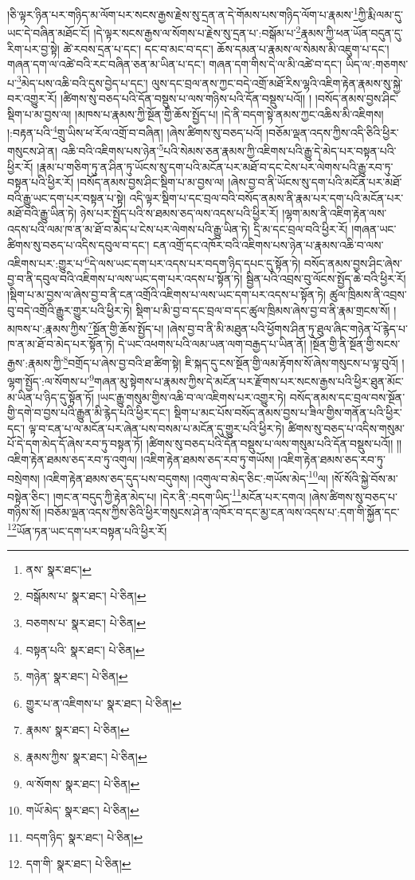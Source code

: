 །ཅི་ལྟར་ཉིན་པར་གཉིད་མ་ལོག་པར་སངས་རྒྱས་རྗེས་སུ་དྲན་ན་དེ་གོམས་པས་གཉིད་ལོག་པ་རྣམས་\footnote{ནས་  སྣར་ཐང་། }ཀྱི་རྨི་ལམ་དུ་ཡང་དེ་བཞིན་མཐོང་ངོ། །དེ་ལྟར་སངས་རྒྱས་ལ་སོགས་པ་རྗེས་སུ་དྲན་པ་:བསྒོམ་པ་\footnote{བསྒོམས་པ་  སྣར་ཐང་།  པེ་ཅིན། }རྣམས་ཀྱི་ཕན་ཡོན་བདུན་དུ་རིག་པར་བྱ་སྟེ། ཚེ་རབས་དྲན་པ་དང་། དང་བ་མང་བ་དང་། ཆོས་དམན་པ་རྣམས་ལ་སེམས་མི་འཇུག་པ་དང་། གཞན་དག་ལ་འཚེ་བའི་རང་བཞིན་ཅན་མ་ཡིན་པ་དང་། གཞན་དག་གིས་དེ་ལ་མི་འཚེ་བ་དང་། ཡིད་ལ་:གཅགས་པ་\footnote{བཅགས་པ་  སྣར་ཐང་།  པེ་ཅིན། }མེད་པས་འཆི་བའི་དུས་བྱེད་པ་དང་། ལུས་དང་བྲལ་ནས་ཀྱང་བདེ་འགྲོ་མཐོ་རིས་ལྷའི་འཇིག་རྟེན་རྣམས་སུ་སྐྱེ་བར་འགྱུར་རོ། །ཚིགས་སུ་བཅད་པའི་དོན་བསྡུས་པ་ལས་གཉིས་པའི་དོན་བསྡུས་པའོ།། །
།བསོད་ནམས་བྱས་ཤིང་སྡིག་པ་མ་བྱས་ལ། །མཁས་པ་རྣམས་ཀྱི་སྔོན་གྱི་ཆོས་སྤྱོད་པ། །དེ་ནི་བདག་སྟེ་ནམས་ཀྱང་འཆིས་མི་འཇིགས། །:བརྟན་པའི་\footnote{བསྟན་པའི་  སྣར་ཐང་།  པེ་ཅིན། }གྲུ་ཡིས་ཕ་རོལ་འགྲོ་བ་བཞིན། །ཞེས་ཚིགས་སུ་བཅད་པའོ། །བཅོམ་ལྡན་འདས་ཀྱིས་འདི་ཅིའི་ཕྱིར་གསུངས་ཤེ་ན། འཆི་བའི་འཇིགས་པས་ཉེན་\footnote{གཉེན་  སྣར་ཐང་།  པེ་ཅིན། }པའི་སེམས་ཅན་རྣམས་ཀྱི་འཇིགས་པའི་རྒྱུ་དེ་མེད་པར་བསྟན་པའི་ཕྱིར་རོ། །རྣམ་པ་གཅིག་ཏུ་ན་ཤིན་ཏུ་ཡོངས་སུ་དག་པའི་མངོན་པར་མཐོ་བ་དང་ངེས་པར་ལེགས་པའི་རྒྱུ་རབ་ཏུ་བསྟན་པའི་ཕྱིར་རོ། །བསོད་ནམས་བྱས་ཤིང་སྡིག་པ་མ་བྱས་ལ། །ཞེས་བྱ་བ་ནི་ཡོངས་སུ་དག་པའི་མངོན་པར་མཐོ་བའི་རྒྱུ་ཡང་དག་པར་བསྟན་པ་སྟེ། འདི་ལྟར་སྡིག་པ་དང་བྲལ་བའི་བསོད་ནམས་ནི་རྣམ་པར་དག་པའི་མངོན་པར་མཐོ་བའི་རྒྱུ་ཡིན་ཏེ། ཉེས་པར་སྤྱོད་པའི་ས་ཐམས་ཅད་ལས་འདས་པའི་ཕྱིར་རོ། །ལྷག་མས་ནི་འཇིག་རྟེན་ལས་འདས་པའི་ལམ་ཁ་ན་མ་ཐོ་བ་མེད་པ་ངེས་པར་ལེགས་པའི་རྒྱུ་ཡིན་ཏེ། དྲི་མ་དང་བྲལ་བའི་ཕྱིར་རོ། །གཞན་ཡང་ཚིགས་སུ་བཅད་པ་འདིས་དབུལ་བ་དང་། ངན་འགྲོ་དང་འཁོར་བའི་འཇིགས་པས་ཉེན་པ་རྣམས་འཆི་བ་ལས་འཇིགས་པར་:གྱུར་པ་\footnote{གྱུར་པ་ན་འཇིགས་པ་  སྣར་ཐང་།  པེ་ཅིན། }དེ་ལས་ཡང་དག་པར་འདས་པར་བདག་ཉིད་དཔང་དུ་སྟོན་ཏེ། བསོད་ནམས་བྱས་ཤིང་ཞེས་བྱ་བ་ནི་དབུལ་བའི་འཇིགས་པ་ལས་ཡང་དག་པར་འདས་པ་སྟོན་ཏེ། སྦྱིན་པའི་འབྲས་བུ་ལོངས་སྤྱོད་ཆེ་བའི་ཕྱིར་རོ། །སྡིག་པ་མ་བྱས་ལ་ཞེས་བྱ་བ་ནི་ངན་འགྲོའི་འཇིགས་པ་ལས་ཡང་དག་པར་འདས་པ་སྟོན་ཏེ། ཚུལ་ཁྲིམས་ནི་འབྲས་བུ་བདེ་འགྲོའི་རྒྱུར་གྱུར་པའི་ཕྱིར་ཏེ། སྡིག་པ་མི་བྱ་བ་དང་བྲལ་བ་དང་ཚུལ་ཁྲིམས་ཞེས་བྱ་བ་ནི་རྣམ་གྲངས་སོ། །མཁས་པ་:རྣམས་ཀྱིས་\footnote{རྣམས་  སྣར་ཐང་།  པེ་ཅིན། }སྔོན་གྱི་ཆོས་སྤྱོད་པ། །ཞེས་བྱ་བ་ནི་མི་མཐུན་པའི་ཕྱོགས་ཤིན་ཏུ་ཐུལ་ཞིང་གཉེན་པོ་རྙེད་པ་ཁ་ན་མ་ཐོ་བ་མེད་པར་སྟོན་ཏེ། དེ་ཡང་འཕགས་པའི་ལམ་ཡན་ལག་བརྒྱད་པ་ཡིན་ནོ། །སྔོན་གྱི་ནི་སྔོན་གྱི་སངས་རྒྱས་:རྣམས་ཀྱི་\footnote{རྣམས་ཀྱིས་  སྣར་ཐང་།  པེ་ཅིན། }བགྲོད་པ་ཞེས་བྱ་བའི་ཐ་ཚིག་སྟེ། ཇི་སྐད་དུ་ངས་སྔོན་གྱི་ལམ་རྟོགས་སོ་ཞེས་གསུངས་པ་ལྟ་བུའོ། །ལྷག་སྤྱོད་:ལ་སོགས་པ་\footnote{ལ་སོགས་  སྣར་ཐང་།  པེ་ཅིན། }གཞན་མུ་སྟེགས་པ་རྣམས་ཀྱིས་དེ་མངོན་པར་རྫོགས་པར་སངས་རྒྱས་པའི་ཕྱིར་ཐུན་མོང་མ་ཡིན་པ་ཉིད་དུ་སྟོན་ཏོ། །ཡང་རྒྱུ་གསུམ་གྱིས་འཆི་བ་ལ་འཇིགས་པར་འགྱུར་ཏེ། བསོད་ནམས་དང་བྲལ་བས་སྔོན་གྱི་དགེ་བ་བྱས་པའི་རྒྱུན་མི་རྙེད་པའི་ཕྱིར་དང་། སྡིག་པ་མང་པོས་བསོད་ནམས་བྱས་པ་ཟིལ་གྱིས་གནོན་པའི་ཕྱིར་དང་། ལྟ་བ་ངན་པ་ལ་མངོན་པར་ཞེན་པས་བསམ་པ་མངོན་དུ་གྱུར་པའི་ཕྱིར་ཏེ། ཚིགས་སུ་བཅད་པ་འདིས་གསུམ་པོ་དེ་དག་མེད་དོ་ཞེས་རབ་ཏུ་བསྟན་ཏོ། །ཚིགས་སུ་བཅད་པའི་དོན་བསྡུས་པ་ལས་གསུམ་པའི་དོན་བསྡུས་པའོ།། །།འཇིག་རྟེན་ཐམས་ཅད་རབ་ཏུ་འགུལ། །འཇིག་རྟེན་ཐམས་ཅད་རབ་ཏུ་གཡོས། །འཇིག་རྟེན་ཐམས་ཅད་རབ་ཏུ་བསྲེགས། །འཇིག་རྟེན་ཐམས་ཅད་དུད་པས་བདུགས། །འགུལ་བ་མེད་ཅིང་:གཡོས་མེད་\footnote{གཡོ་མེད་  སྣར་ཐང་།  པེ་ཅིན། }ལ། །སོ་སོའི་སྐྱེ་བོས་མ་བསྟེན་ཅིང་། །གང་ན་བདུད་ཀྱི་རྟེན་མེད་པ། །དེར་ནི་:བདག་ཡིད་\footnote{བདག་ཉིད་  སྣར་ཐང་།  པེ་ཅིན། }མངོན་པར་དགའ། །ཞེས་ཚིགས་སུ་བཅད་པ་གཉིས་སོ། །བཅོམ་ལྡན་འདས་ཀྱིས་ཅིའི་ཕྱིར་གསུངས་ཤེ་ན་འཁོར་བ་དང་མྱ་ངན་ལས་འདས་པ་:དག་གི་སྐྱོན་དང་\footnote{དག་གི་  སྣར་ཐང་།  པེ་ཅིན། }ཡོན་ཏན་ཡང་དག་པར་བསྟན་པའི་ཕྱིར་རོ། 